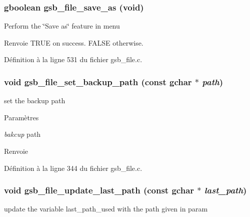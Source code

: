 \subsubsection[{gsb\_\-file\_\-save\_\-as}]{\setlength{\rightskip}{0pt plus 5cm}gboolean gsb\_\-file\_\-save\_\-as (void)}\label{gsb__file_8c_ac88aac4aa8b7ad7c91d5703b36c08eed}
Perform the \char`\"{}Save as\char`\"{} feature in menu

\begin{DoxyReturn}{Renvoie}
TRUE on success. FALSE otherwise. 
\end{DoxyReturn}


Définition à la ligne 531 du fichier gsb\_\-file.c.

\subsubsection[{gsb\_\-file\_\-set\_\-backup\_\-path}]{\setlength{\rightskip}{0pt plus 5cm}void gsb\_\-file\_\-set\_\-backup\_\-path (const gchar $\ast$ {\em path})}\label{gsb__file_8c_a69328a78586ad0fc193072ffc634e1f4}
set the backup path


\begin{DoxyParams}{Paramètres}
\item[{\em bakcup}]path\end{DoxyParams}
\begin{DoxyReturn}{Renvoie}

\end{DoxyReturn}


Définition à la ligne 344 du fichier gsb\_\-file.c.

\subsubsection[{gsb\_\-file\_\-update\_\-last\_\-path}]{\setlength{\rightskip}{0pt plus 5cm}void gsb\_\-file\_\-update\_\-last\_\-path (const gchar $\ast$ {\em last\_\-path})}\label{gsb__file_8c_abea90088f86f05e8386739483e16b380}
update the variable last\_\-path\_\-used with the path given in param


